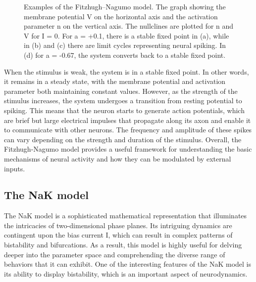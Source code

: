 \documentclass[12pt,a4paper]{report}
\begin{document}
\begin{figure}[H]
    \centering %
\caption{Examples of the Fitzhugh–Nagumo model. The graph showing the membrane potential V on the horizontal axis and the activation parameter n on the vertical axis. The nullclines are plotted for n and V for I = 0. For a = +0.1, there is a stable fixed point in (a), while in (b) and (c) there are limit cycles representing neural spiking. In (d) for a = -0.67, the system converts back to a stable fixed point. \cite{ref8}} 

\end{figure}
    
When the stimulus is weak, the system is in a stable fixed point. In other words, it remains in a steady state, with the membrane potential and activation parameter both maintaining constant values. However, as the strength of the stimulus increases, the system undergoes a transition from resting potential to spiking. This means that the neuron starts to generate action potentials, which are brief but large electrical impulses that propagate along its axon and enable it to communicate with other neurons. The frequency and amplitude of these spikes can vary depending on the strength and duration of the stimulus\cite{ref8}. Overall, the Fitzhugh-Nagumo model provides a useful framework for understanding the basic mechanisms of neural activity and how they can be modulated by external inputs.


\subsection{The NaK model}
The NaK model is a sophisticated mathematical representation that illuminates the intricacies of two-dimensional phase planes. Its intriguing dynamics are contingent upon the bias current I, which can result in complex patterns of bistability and bifurcations. As a result, this model is highly useful for delving deeper into the parameter space and comprehending the diverse range of behaviors that it can exhibit. One of the interesting features of the NaK model is its ability to display bistability, which is an important aspect of neurodynamics. 
\end{document}
